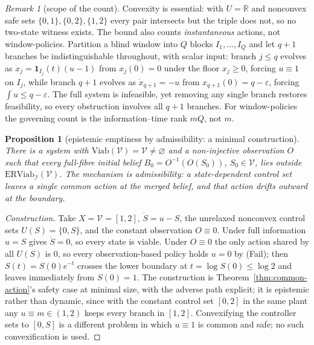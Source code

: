 \documentclass[11pt,a4paper]{article}
\theoremstyle{plain}
\newtheorem{proposition}[theorem]{Proposition}
\theoremstyle{definition}
\theoremstyle{remark}
\newtheorem{remark}[theorem]{Remark}
\newcommand{\R}{\mathbb{R}}
\newcommand{\Viab}{\mathrm{Viab}}
\newcommand{\ERViab}{\mathrm{ERViab}}
\newcommand{\cV}{\mathcal{V}}
\newcommand{\cI}{\mathcal{I}}
\newcommand{\hyp}[1]{\textup{(#1)}}
\begin{document}
\begin{remark}[scope of the count]\label{rem:count}
Convexity is essential: with $U=\R$ and nonconvex safe sets $\{0,1\},\{0,2\},\{1,2\}$ every pair intersects but the triple does not, so no two-state witness exists. The bound also counts \emph{instantaneous} actions, not window-policies. Partition a blind window into $Q$ blocks $I_1,\dots,I_Q$ and let $q+1$ branches be indistinguishable throughout, with scalar input: branch $j\le q$ evolves as $\dot x_j=\mathbf 1_{I_j}(t)(u-1)$ from $x_j(0)=0$ under the floor $x_j\ge0$, forcing $u\equiv1$ on $I_j$, while branch $q+1$ evolves as $\dot x_{q+1}=-u$ from $x_{q+1}(0)=q-\varepsilon$, forcing $\int u\le q-\varepsilon$. The full system is infeasible, yet removing any single branch restores feasibility, so every obstruction involves all $q+1$ branches. For window-policies the governing count is the information--time rank $mQ$, not $m$.
\end{remark}

\begin{proposition}[epistemic emptiness by admissibility: a minimal construction]\label{prop:emptiness}
There is a system with $\Viab(\cV)=\cV\ne\varnothing$ and a non-injective observation $O$ such that every full-fibre initial belief $B_0=O^{-1}(O(S_0))$, $S_0\in\cV$, lies outside $\ERViab_\cI(\cV)$. The mechanism is admissibility: a state-dependent control set leaves a single common action at the merged belief, and that action drifts outward at the boundary.
\end{proposition}

\begin{proof}[Construction]
Take $X=\cV=[1,2]$, $\dot S=u-S$, the unrelaxed nonconvex control sets $U(S)=\{0,S\}$, and the constant observation $O\equiv0$. Under full information $u=S$ gives $\dot S=0$, so every state is viable. Under $O\equiv0$ the only action shared by all $U(S)$ is $0$, so every observation-based policy holds $u=0$ by \hyp{Fail}; then $S(t)=S(0)e^{-t}$ crosses the lower boundary at $t=\log S(0)\le\log2$ and leaves immediately from $S(0)=1$. The construction is Theorem~\ref{thm:common-action}'s safety case at minimal size, with the adverse path explicit; it is epistemic rather than dynamic, since with the constant control set $[0,2]$ in the same plant any $u\equiv m\in(1,2)$ keeps every branch in $[1,2]$. Convexifying the controller sets to $[0,S]$ is a different problem in which $u\equiv1$ is common and safe; no such convexification is used.
\end{proof}
\end{document}
